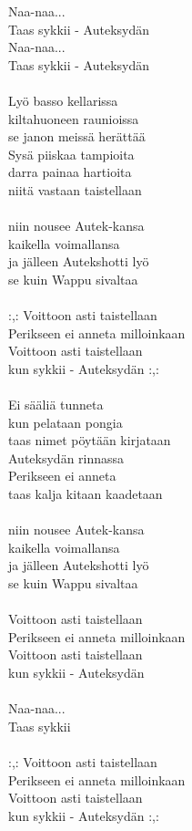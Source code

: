 
Naa-naa... \\ Taas sykkii - Auteksydän \\ Naa-naa... \\ Taas sykkii - Auteksydän \\ \hspace{10mm} \\ Lyö basso kellarissa \\ kiltahuoneen raunioissa \\ se janon meissä herättää \\ Sysä piiskaa tampioita \\ darra painaa hartioita \\ niitä vastaan taistellaan \\ \hspace{10mm} \\ niin nousee Autek-kansa \\ kaikella voimallansa \\ ja jälleen Autekshotti lyö \\ se kuin Wappu sivaltaa \\ \hspace{10mm} \\ :,: Voittoon asti taistellaan \\ Perikseen ei anneta milloinkaan \\ Voittoon asti taistellaan \\ kun sykkii - Auteksydän :,: \\ \hspace{10mm} \\ Ei sääliä tunneta \\ kun pelataan pongia \\ taas nimet pöytään kirjataan \\ Auteksydän rinnassa \\ Perikseen ei anneta \\ taas kalja kitaan kaadetaan \\ \hspace{10mm} \\ niin nousee Autek-kansa \\ kaikella voimallansa \\ ja jälleen Autekshotti lyö \\ se kuin Wappu sivaltaa \\ \hspace{10mm} \\ Voittoon asti taistellaan \\ Perikseen ei anneta milloinkaan \\ Voittoon asti taistellaan \\ kun sykkii - Auteksydän \\ \hspace{10mm} \\ Naa-naa... \\ Taas sykkii \\ \hspace{10mm} \\ :,: Voittoon asti taistellaan \\ Perikseen ei anneta milloinkaan \\ Voittoon asti taistellaan \\ kun sykkii - Auteksydän :,: